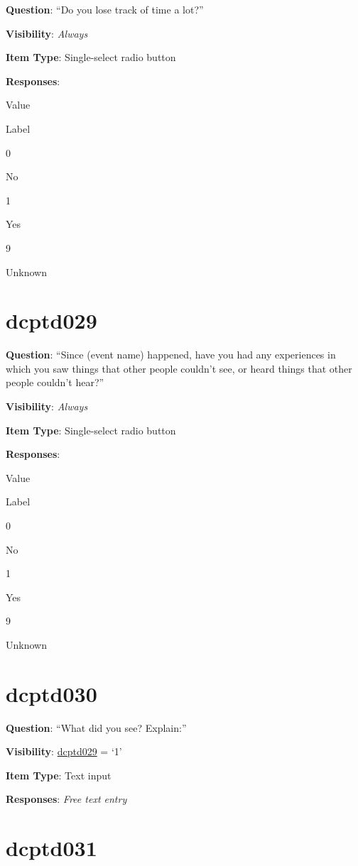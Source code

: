 \documentclass[]{book}
\begin{document}
\textbf{Question}: ``Do you lose track of time a lot?''

\textbf{Visibility}: \emph{Always}

\textbf{Item Type}: Single-select radio button

\textbf{Responses}:

Value

Label

0

No

1

Yes

9

Unknown

\hypertarget{dcptd029}{%
\section{dcptd029}\label{dcptd029}}

\textbf{Question}: ``Since (event name) happened, have you had any experiences in which you saw things that other people couldn't see, or heard things that other people couldn't hear?''

\textbf{Visibility}: \emph{Always}

\textbf{Item Type}: Single-select radio button

\textbf{Responses}:

Value

Label

0

No

1

Yes

9

Unknown

\hypertarget{dcptd030}{%
\section{dcptd030}\label{dcptd030}}

\textbf{Question}: ``What did you see? Explain:''

\textbf{Visibility}: \protect\hyperlink{dcptd029}{dcptd029} = `1'

\textbf{Item Type}: Text input

\textbf{Responses}: \emph{Free text entry}

\hypertarget{dcptd031}{%
\section{dcptd031}\label{dcptd031}}
\end{document}
